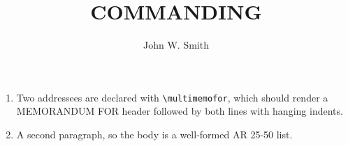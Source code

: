 \documentclass{../armymemo}
\author{John W. Smith}\rank{CPT}\branch{CY}
\title{COMMANDING}
\begin{document}
\begin{enumerate}
	\item Two addressees are declared with \verb|\multimemofor|, which should render a
	      MEMORANDUM FOR header followed by both lines with hanging indents.
	\item A second paragraph, so the body is a well-formed AR 25-50 list.
\end{enumerate}
\end{document}
